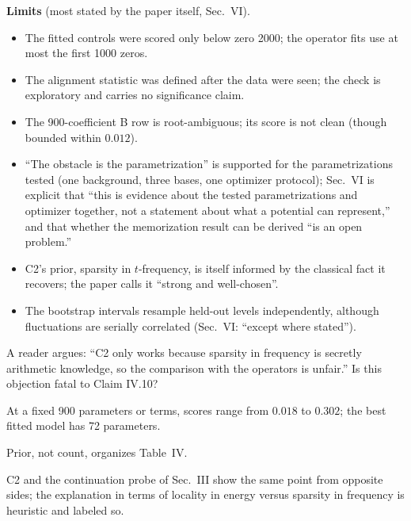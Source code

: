 \textbf{Limits} (most stated by the paper itself, Sec.~VI).
\begin{itemize}
\item The fitted controls were scored only below zero 2000; the operator fits use at most the first 1000 zeros.
\item The alignment statistic was defined after the data were seen; the check is exploratory and carries no significance claim.
\item The 900-coefficient B row is root-ambiguous; its score is not clean (though bounded within $0.012$).
\item ``The obstacle is the parametrization'' is supported for the parametrizations tested (one background, three bases, one optimizer protocol); Sec.~VI is explicit that ``this is evidence about the tested parametrizations and optimizer together, not a statement about what a potential can represent,'' and that whether the memorization result can be derived ``is an open problem.''
\item C2's prior, sparsity in $t$-frequency, is itself informed by the classical fact it recovers; the paper calls it ``strong and well-chosen''.
\item The bootstrap intervals resample held-out levels independently, although fluctuations are serially correlated (Sec.~VI: ``except where stated'').
\end{itemize}

\begin{checkpoint}
A reader argues: ``C2 only works because sparsity in frequency is secretly arithmetic knowledge, so the comparison with the operators is unfair.'' Is this objection fatal to Claim IV.10?
\end{checkpoint}

\begin{keyideas}
\item At a fixed 900 parameters or terms, scores range from $0.018$ to $0.302$; the best fitted model has 72 parameters.
\item Prior, not count, organizes Table~IV.
\item C2 and the continuation probe of Sec.~III show the same point from opposite sides; the explanation in terms of locality in energy versus sparsity in frequency is heuristic and labeled so.
\end{keyideas}

